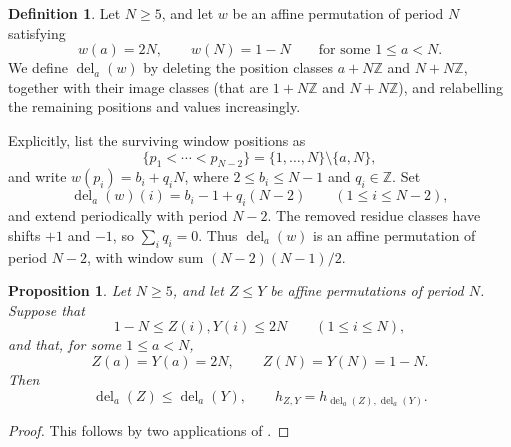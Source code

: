 \documentclass[11pt,a4paper,reqno]{amsart}
\numberwithin{equation}{section}
\newtheorem{proposition}[theorem]{Proposition}
\theoremstyle{definition}
\newtheorem{definition}[theorem]{Definition}
\theoremstyle{remark}
\theoremstyle{plain}
\newcommand{\Z}{\mathbb Z}
\begin{document}
\begin{definition}\label{def:paired-deletion}
Let $N\geq5$, and let $w$ be an affine permutation of period $N$
satisfying
\[
 w(a)=2N,\qquad w(N)=1-N
 \qquad\text{for some }1\leq a<N.
\]
We define $\operatorname{del}_a(w)$ by deleting the position classes
$a+N\mathbb Z$ and $N+N\mathbb Z$, together with their image classes (that are $1+N\Z$ and $N+N\Z$),
and relabelling the remaining positions and values increasingly.

Explicitly, list the surviving window positions as
\[
 \{p_1<\cdots<p_{N-2}\}=\{1,\ldots,N\}\setminus\{a,N\},
\]
and write $w(p_i)=b_i+q_iN$, where $2\leq b_i\leq N-1$ and
$q_i\in\mathbb Z$. Set
\[
 \operatorname{del}_a(w)(i)=b_i-1+q_i(N-2)
 \qquad(1\leq i\leq N-2),
\]
and extend periodically with period $N-2$.
The removed residue classes have shifts $+1$ and $-1$, so
$\sum_iq_i=0$. Thus $\operatorname{del}_a(w)$ is an affine permutation
of period $N-2$, with window sum $(N-2)(N-1)/2$.
\end{definition}

\begin{proposition}\label{prop:affine-cancel}
Let $N\geq5$, and let $Z\leq Y$ be affine permutations of period $N$.
Suppose that
\[
 1-N\leq Z(i),Y(i)\leq2N\qquad(1\leq i\leq N),
\]
and that, for some $1\leq a<N$,
\[
 Z(a)=Y(a)=2N,\qquad Z(N)=Y(N)=1-N.
\]
Then
\[
 \operatorname{del}_a(Z)\leq\operatorname{del}_a(Y),\qquad
 h_{Z,Y}=h_{\operatorname{del}_a(Z),\operatorname{del}_a(Y)}.
\]
\end{proposition}
\begin{proof}
This follows by two applications of 
\cite[Proposition~4.2]{Henderson}. 
\end{proof}
\end{document}
